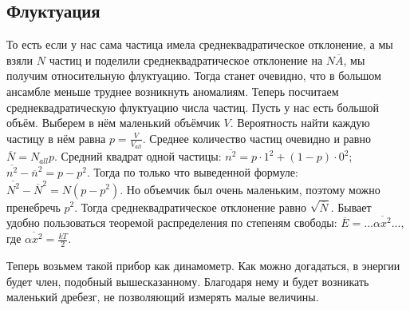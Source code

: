 \documentclass[a4paper, 12pt]{article}
\begin{document}
	\subsection{Флуктуация}
	То есть если у нас сама частица имела среднеквадратическое отклонение, а мы взяли $N$ частиц и поделили среднеквадратическое отклонение на $N \overline{A}$, мы получим относительную флуктуацию. Тогда станет очевидно, что в большом ансамбле меньше труднее возникнуть аномалиям.
	Теперь посчитаем среднеквадратическую флуктуацию числа частиц. Пусть у нас есть большой объём. Выберем в нём маленький объёмчик $V$. Вероятность найти каждую частицу в нём равна $p = \frac{V}{V_{all}}$. Среднее количество частиц очевидно и равно $\overline{N} = N_{all} p$. Средний квадрат одной частицы: $\overline{n^{2}} = p \cdot 1^{2} + (1-p) \cdot 0^{2}$; $\overline{n^{2}} - \overline{n}^{2} = p - p^{2}$. Тогда по только что выведенной формуле: $\overline{N^{2}} - \overline{N}^{2} = N(p - p^{2})$. Но объемчик был очень маленьким, поэтому можно пренебречь $p^{2}$. Тогда среднеквадратическое отклонение равно $\sqrt{\overline{N}}$.
	Бывает удобно пользоваться теоремой распределения по степеням свободы: $\overline{E} = ... \overline{\alpha x^{2}} ...$, где $ \overline{\alpha x^{2}} = \frac{kT}{2}$.
	
	Теперь возьмем такой прибор как динамометр. Как можно догадаться, в энергии будет член, подобный вышесказанному. Благодаря нему и будет возникать маленький дребезг, не позволяющий измерять малые величины. 
\end{document}

